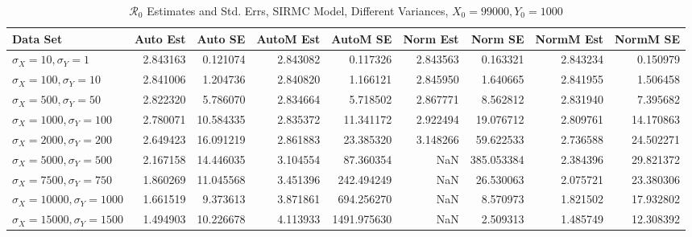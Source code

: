 \documentclass[12pt]{article}
\newcommand{\rr}{\ensuremath{\mathcal{R}_0}}
\begin{document}
\begin{table}[H]
	
	\caption{$\rr$ Estimates and Std. Errs, SIRMC Model,
		Different Variances, 
		$X_0 = 99000, Y_0 = 1000$}
	\begin{footnotesize}
		\hskip -1.7cm
		\begin{tabular}{l|r|r|r|r|r|r|r|r}
			\hline
			Data Set & Auto Est & Auto SE & AutoM Est & AutoM SE & Norm Est & Norm SE & NormM Est & NormM SE\\
			\hline
			$\sigma_X = 10, \sigma_Y = 1$ & 2.843163 & 0.121074 & 2.843082 & 0.117326 & 2.843563 & 0.163321 & 2.843234 & 0.150979\\
			\hline
			$\sigma_X = 100, \sigma_Y = 10$ & 2.841006 & 1.204736 & 2.840820 & 1.166121 & 2.845950 & 1.640665 & 2.841955 & 1.506458\\
			\hline
			$\sigma_X = 500, \sigma_Y = 50$ & 2.822320 & 5.786070 & 2.834664 & 5.718502 & 2.867771 & 8.562812 & 2.831940 & 7.395682\\
			\hline
			$\sigma_X = 1000, \sigma_Y = 100$ & 2.780071 & 10.584335 & 2.835372 & 11.341172 & 2.922494 & 19.076712 & 2.809761 & 14.170863\\
			\hline
			$\sigma_X = 2000, \sigma_Y = 200$ & 2.649423 & 16.091219 & 2.861883 & 23.385320 & 3.148266 & 59.622533 & 2.736588 & 24.502271\\
			\hline
			$\sigma_X = 5000, \sigma_Y = 500$ & 2.167158 & 14.446035 & 3.104554 & 87.360354 & NaN & 385.053384 & 2.384396 & 29.821372\\
			\hline
			$\sigma_X = 7500, \sigma_Y = 750$ & 1.860269 & 11.045568 & 3.451396 & 242.494249 & NaN & 26.530063 & 2.075721 & 23.380306\\
			\hline
			$\sigma_X = 10000, \sigma_Y = 1000$ & 1.661519 & 9.373613 & 3.871861 & 694.256270 & NaN & 8.570973 & 1.821502 & 17.932802\\
			\hline
			$\sigma_X = 15000, \sigma_Y = 1500$ & 1.494903 & 10.226678 & 4.113933 & 1491.975630 & NaN & 2.509313 & 1.485749 & 12.308392\\
			\hline
		\end{tabular}
	\end{footnotesize}
\end{table}
\end{document}
